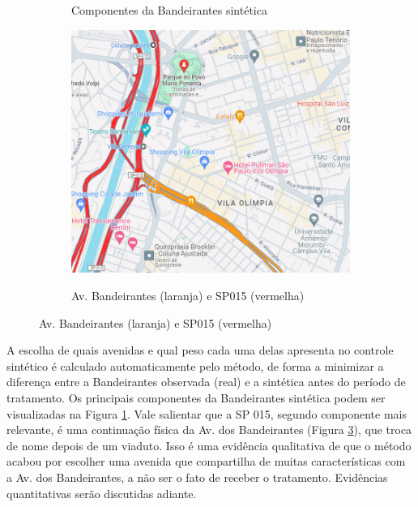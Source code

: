 \begin{figure}[h]
    \caption{Construção do controle sintético}
    \begin{subfigure}[t]{0.45\linewidth}
        \centering
        \caption{Componentes da Bandeirantes sintética}
        \begin{adjustbox}{width = \linewidth}
            
        \end{adjustbox}
        \label{fig:bandeirantes_sintetica}
    \end{subfigure}
    \hfill
    \begin{subfigure}[t]{0.45\linewidth}
        \centering
        \caption{Av. Bandeirantes (laranja) e SP015 (vermelha)}
        \includegraphics[width=.8\linewidth]{relatorios/faixa-azul/figuras/band.png}
        \label{fig:sp015}
    \end{subfigure}
\end{figure}

A escolha de quais avenidas e qual peso cada uma delas apresenta no controle sintético é calculado automaticamente pelo método, de forma a minimizar a diferença entre a Bandeirantes observada (real) e a sintética antes do período de tratamento. Os principais componentes da Bandeirantes sintética podem ser visualizadas na Figura \ref{fig:bandeirantes_sintetica}. Vale salientar que a SP 015, segundo componente mais relevante, é uma continuação física da Av. dos Bandeirantes (Figura \ref{fig:sp015}), que troca de nome depois de um viaduto. Isso é uma evidência qualitativa de que o método acabou por escolher uma avenida que compartilha de muitas características com a Av. dos Bandeirantes, a não ser o fato de receber o tratamento. Evidências quantitativas serão discutidas adiante.

